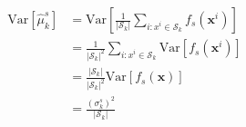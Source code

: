 \documentclass[wcp]{jmlr}
\newcommand{\xb}{\mathbf{x}}
\begin{document}
\begin{equation}
  \begin{split}
  \mathrm{Var}[\hat{\mu}_k^s] &= \mathrm{Var} [\frac{1}{|\mathcal{S}_k|} \sum_{i: x^i\in \mathcal{S}_k} f_s(\xb^i)] \\
                              &= \frac{1}{|\mathcal{S}_k|^2} \sum_{i: x^i\in \mathcal{S}_k} \mathrm{Var}[f_s(\xb^i)] \\
                              &= \frac{|\mathcal{S}_k|}{|\mathcal{S}_k|^2} \mathrm{Var}[f_s(\xb)] \\
  &= \frac{(\sigma_k^s)^2}{|\mathcal{S}_k|}  \\
  \end{split}
\end{equation}





\end{document}
